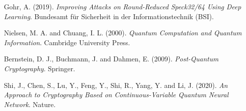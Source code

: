 \documentclass[%
    corpo=11pt,
    twoside,
    stile=classica,
    oldstyle,
    autoretitolo,
    tipotesi=magistrale,
    greek,
    evenboxes,
    english
]{toptesi}
\begin{document}
\begin{thebibliography}{99}
 {\sc Gohr, A.} (2019). \textit{Improving Attacks on Round-Reduced Speck32/64 Using Deep Learning}. Bundesamt für Sicherheit in der Informationstechnik (BSI).

 {\sc Nielsen, M. A.} and {\sc Chuang, I. L.} (2000). \textit{Quantum Computation and Quantum Information}. Cambridge University Press.

 {\sc Bernstein, D. J.}, {\sc Buchmann, J.} and {\sc Dahmen, E.} (2009). \textit{Post-Quantum Cryptography}. Springer.

 {\sc Shi, J.}, {\sc Chen, S.}, {\sc Lu, Y.}, {\sc Feng, Y.}, {\sc Shi, R.}, {\sc Yang, Y.} and {\sc Li, J.} (2020). \textit{An Approach to Cryptography Based on Continuous-Variable Quantum Neural Network}. Nature.

\end{thebibliography}
\end{document}
